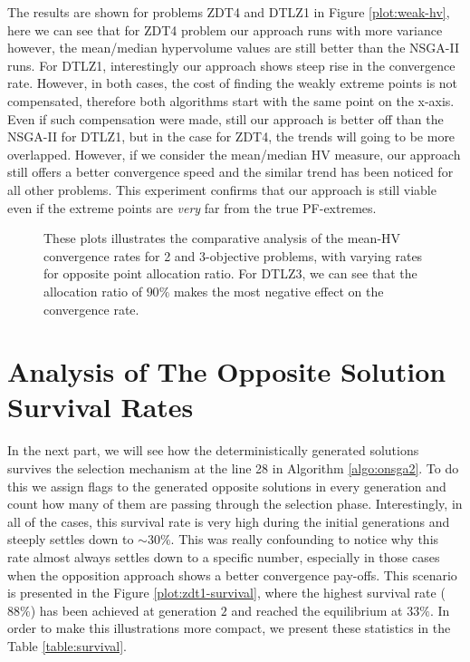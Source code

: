 \documentclass{sig-alternate-05-2015}
\begin{document}
The results are shown for problems ZDT4 and DTLZ1 in Figure \ref{plot:weak-hv}, here we can see that for ZDT4 problem our approach runs with more variance however, the mean/median hypervolume values are still better than the NSGA-II runs. For DTLZ1, interestingly our approach shows steep rise in the convergence rate. However, in both cases, the cost of finding the weakly extreme points is not compensated, therefore both algorithms start with the same point on the x-axis. Even if such compensation were made, still our approach is better off than the NSGA-II for DTLZ1, but in the case for ZDT4, the trends will going to  be more overlapped. However, if we consider the mean/median HV measure, our approach still offers a better convergence speed and the similar trend has been noticed for all other problems. This experiment confirms that our approach is still viable even if the extreme points are \textit{very} far from the true PF-extremes.

%
\begin{figure*}[!hbp]
	\centering
	\hfill
	\caption{These plots illustrates the comparative analysis of the mean-HV convergence rates for 2 and 3-objective problems, with varying rates for opposite point allocation ratio. For DTLZ3, we can see that the allocation ratio of \(90\%\) makes the most negative effect on the convergence rate.}
	\label{plot:hv-trends}
\end{figure*}
%
\section{Analysis of The Opposite Solution Survival Rates}
\label{sec:survival}
In the next part, we will see how the deterministically generated solutions survives the selection mechanism at the line 28 in Algorithm \ref{algo:onsga2}. To do this we assign flags to the generated opposite solutions in every generation and count how many of them are passing through the selection phase. Interestingly, in all of the cases, this survival rate is very high during the initial generations and steeply settles down to \(\sim30\%\). This was really confounding to notice why this rate almost always settles down to a specific number, especially in those cases when the opposition approach shows a better convergence pay-offs. This scenario is presented in the Figure \ref{plot:zdt1-survival}, where the highest survival rate (\(88\%\)) has been achieved at generation \(2\) and reached the equilibrium at \(33\%\). In order to make this illustrations more compact, we present these statistics in the Table \ref{table:survival}.
\end{document}
